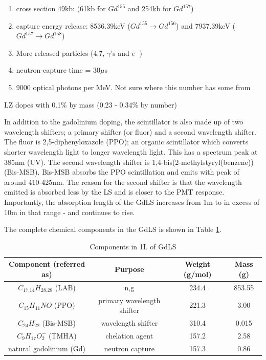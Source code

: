 \begin{enumerate}
    \item cross section 49kb: (61kb for $Gd^{155}$ and 254kb for $Gd^{157}$)
    \item capture energy release: 8536.39keV ($Gd^{155} \xrightarrow{} Gd^{156}$) and 7937.39keV ($Gd^{157} \xrightarrow{} Gd^{158}$)
    \item More released particles (4.7, $\gamma$'s and $e^{-}$)
    \item neutron-capture time = 30$\mu$s
    \item 9000 optical photons per MeV. Not sure where this number has some from
\end{enumerate}

\par
LZ dopes with 0.1\% by mass (0.23 - 0.34\% by number)

\par
In addition to the gadolinium doping, the scintillator is also made up of two wavelength shifters; a primary shifter (or fluor) and a second wavelength shifter.
The fluor is 2,5-diphenyloxazole (PPO); an organic scintillator which converts shorter wavelength light to longer wavelength light. 
This has a spectrum peak at 385nm (UV).
The second wavelength shifter is 1,4-bis(2-methylstyryl(benzene)) (Bis-MSB). 
Bis-MSB absorbs the PPO scintillation and emits with peak of around 410-425nm.
The reason for the second shifter is that the wavelength emitted is absorbed less by the LS and is closer to the PMT response.
Importantly, the absorption length of the GdLS increases from 1m to in excess of 10m in that range - and continues to rise.

\par
The complete chemical components in the GdLS is shown in Table \ref{tab:GdLS_Components}.

\begin{table}[!htbp]
    \centering
    \begin{tabular}{c | c | c | c}
    \hline
    {Component (referred as)} & {Purpose} & {Weight (g/mol)} & {Mass (g)} \\ \hline
    $C_{17.14}H_{28.28}$ (LAB) & n,g & 234.4  & 853.55 \\
    $C_{15}H_{11}NO$ (PPO) & primary wavelength shifter & 221.3 & 3.00 \\
    $C_{24}H_{22}$ (Bis-MSB) & wavelength shifter & 310.4 & 0.015 \\
    $C_{9}H_{17}O^{-}_{2}$ (TMHA) & chelation agent & 157.2 & 2.58 \\
    natural gadolinium (Gd) & neutron capture & 157.3 & 0.86 
    \end{tabular}
    \caption{Components in 1L of GdLS}
    \label{tab:GdLS_Components}
\end{table} 

